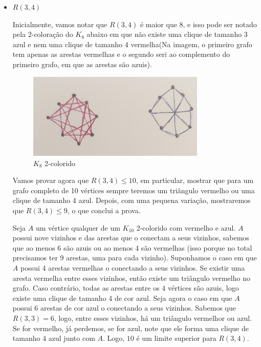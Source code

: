 \documentclass{article}
\begin{document}
\begin{itemize}
\begin{itemize}
		      \item \(R(3, 4)\)

		            Inicialmente, vamos notar que \(R(3, 4)\) é maior que 8, e isso pode ser notado pela 2-coloração do \(K_8\) abaixo em que
		            não existe uma clique de tamanho 3 azul e nem uma clique de tamanho 4 vermelha(Na imagem, o primeiro grafo tem apenas as arestas vermelhas
		            e o segundo seri ao complemento do primeiro grafo, em que as arestas são azuis).

		            \begin{figure}[H]
			            \centering
			            \includegraphics[width=0.8\textwidth]{images/1b.jpeg}
			            \caption{\(K_8\) 2-colorido}
		            \end{figure}

		            Vamos provar agora que \(R(3, 4) \leq 10\), em particular, mostrar que para um grafo completo de 10 vértices sempre teremos um triângulo
		            vermelho ou uma clique de tamanho 4 azul. Depois, com uma pequena variação, mostraremos que \(R(3,4) \leq 9\), o que conclui a prova.

		            Seja \(A\) um vértice qualquer de um \(K_{10}\) 2-colorido com vermelho e azul. \(A\) possui nove vizinhos e das arestas que o conectam a seus vizinhos,
		            sabemos que ao menos 6 são azuis ou ao menos 4 são vermelhas (isso porque no total precisamos ter 9 arestas, uma para cada vizinho). Suponhamos o caso em que
		            \(A\) possui 4 arestas vermelhas o conectando a seus vizinhos. Se existir uma aresta vermelha entre esses vizinhos, então existe um triângulo vermelho no grafo. Caso
		            contrário, todas as arestas entre os 4 vértices são azuis, logo existe uma clique de tamanho 4 de cor azul. Seja agora o caso em que \(A\) possui
		            6 arestas de cor azul o conectando a seus vizinhos. Sabemos que \(R(3, 3) = 6\), logo, entre esses vizinhos, há um triângulo vermelhor ou azul. Se for vermelho,
		            já perdemos, se for azul, note que ele forma uma clique de tamanho 4 azul junto com \(A\). Logo, \(10\) é um limite superior para \(R(3, 4)\).


\end{itemize}
\end{itemize}
\end{document}
